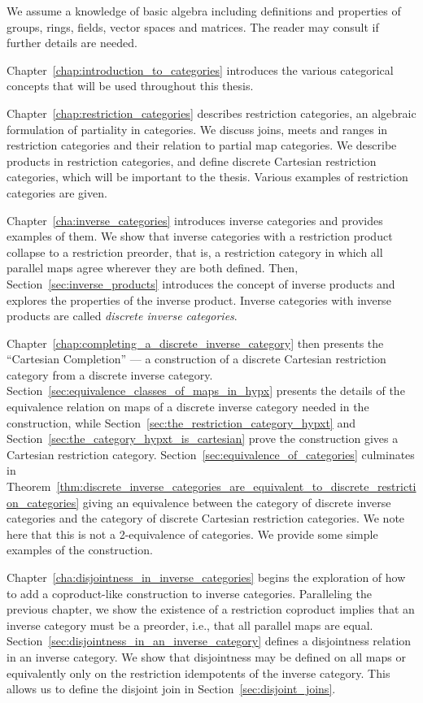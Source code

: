 We assume a knowledge of basic algebra including definitions and properties of groups, rings,
fields, vector spaces and matrices. The reader may consult \cite{lang:algebra} if further details
are needed.

Chapter~\ref{chap:introduction_to_categories} introduces the various categorical concepts that will
be used throughout this thesis.

Chapter~\ref{chap:restriction_categories} describes restriction categories, an algebraic
formulation of partiality in categories. We discuss joins, meets and ranges in
restriction categories and their relation to partial map categories. We describe products in
restriction categories, and define discrete Cartesian restriction categories, which will be
important to the thesis. Various examples of restriction categories are given.

Chapter~\ref{cha:inverse_categories} introduces inverse categories and provides examples of them. We
show that inverse categories with a restriction product collapse to a restriction preorder, that
is, a restriction category in which all parallel maps agree wherever they are both defined. Then,
Section~\ref{sec:inverse_products} introduces the concept of inverse products and explores the
properties of the inverse product. Inverse categories with inverse products are called
\emph{discrete inverse categories}.

Chapter~\ref{chap:completing_a_discrete_inverse_category} then presents the ``Cartesian
Completion'' --- a construction of a discrete Cartesian restriction category from a discrete
inverse category. Section~\ref{sec:equivalence_classes_of_maps_in_hypx} presents the details of the
equivalence relation on  maps of a discrete inverse category needed in the construction, while
Section~\ref{sec:the_restriction_category_hypxt} and
Section~\ref{sec:the_category_hypxt_is_cartesian} prove the construction gives a Cartesian
restriction category. Section~\ref{sec:equivalence_of_categories} culminates in
Theorem~\ref{thm:discrete_inverse_categories_are_equivalent_to_discrete_restriction_categories}
giving an equivalence between the category of discrete inverse categories and the
category of discrete Cartesian restriction categories. We note here that this is not a 2-equivalence
of categories. We provide some simple examples of the construction.


Chapter~\ref{cha:disjointness_in_inverse_categories} begins the exploration of how to add a
coproduct-like construction to inverse categories. Paralleling the previous chapter, we show the
existence of a restriction coproduct implies that an inverse category must be a preorder, i.e.,
that all parallel maps are equal. Section~\ref{sec:disjointness_in_an_inverse_category} defines a
disjointness relation in an inverse category. We show that disjointness may be defined on all maps
or equivalently only on the restriction idempotents of the inverse category. This allows us to
define the disjoint join in Section~\ref{sec:disjoint_joins}.

